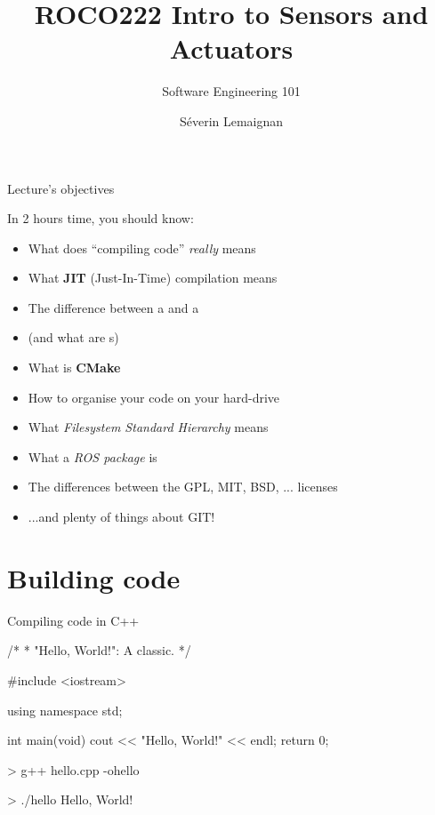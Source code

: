 \documentclass[compress]{beamer}
\title{ROCO222 \newline Intro to Sensors and Actuators}
\subtitle{Software Engineering 101}
\date{}
\author{Séverin Lemaignan}
\institute{Centre for Neural Systems and Robotics\\{\bf Plymouth University}}
\makeatletter
\let\beamer@writeslidentry@miniframeson=\beamer@writeslidentry
\def\beamer@writeslidentry@miniframesoff{%
  \expandafter\beamer@ifempty\expandafter{\beamer@framestartpage}{}%
  {%
    \clearpage\beamer@notesactions%
  }
}
\newcommand*{\miniframeson}{\let\beamer@writeslidentry=\beamer@writeslidentry@miniframeson}
\newcommand*{\miniframesoff}{\let\beamer@writeslidentry=\beamer@writeslidentry@miniframesoff}
\makeatother
\begin{document}

\maketitle

\miniframesoff

\begin{frame}{Lecture's objectives}

    In 2 hours time, you should know:

    \begin{itemize}
        \item What does ``compiling code'' \emph{really} means
        \item What \textbf{JIT} (Just-In-Time) compilation means
        \item The difference between a  and a 
        \item (and what are s)
        \item What is {\bf CMake}
        \item How to organise your code on your hard-drive
        \item What \emph{Filesystem Standard Hierarchy} means
        \item What a \emph{ROS package} is
        \item The differences between the GPL, MIT, BSD, ... licenses
        \item ...and plenty of things about GIT!
    \end{itemize}
\end{frame}

\miniframeson

\section[Compilation]{Building code}

\begin{frame}[fragile]{Compiling code in C++}

\begin{cppcode}
/*
 * "Hello, World!": A classic.
 */

#include <iostream>

using namespace std;

int main(void)
{
    cout << "Hello, World!" << endl;
    return 0;
}
\end{cppcode}

\pause

\begin{shcode}
> g++ hello.cpp -ohello
\end{shcode}

\pause 

\begin{shcode}
> ./hello
Hello, World!
\end{shcode}

\end{frame}
\end{document}
